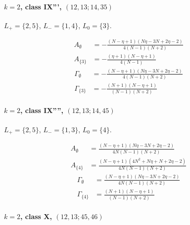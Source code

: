 \documentclass[11pt]{article}
\begin{document}
\paragraph{$k=2$, class IX''', $(12,13;14,35)$}

$L_+=\{2,5\}$, $L_-=\{1,4\}$, $L_0=\{3\}$.

\begin{align*}
  A_{\emptyset} &= - \frac{\left(N - \eta + 1\right) \left(N \eta - 3 N + 2 \eta - 2\right)}{4 \left(N - 1\right) \left(N + 2\right)} \\
  A_{\{3\}} &= - \frac{\left(\eta + 1\right) \left(N - \eta + 1\right)}{4 \left(N - 1\right)} 
\end{align*}
\begin{align*}
  \Gamma_{\emptyset} &= - \frac{\left(N - \eta + 1\right) \left(N \eta - 3 N + 2 \eta - 2\right)}{4 \left(N - 1\right) \left(N + 2\right)} \\
  \Gamma_{\{3\}} &= - \frac{\left(N + 1\right) \left(N - \eta + 1\right)}{\left(N - 1\right) \left(N + 2\right)} 
\end{align*}

\paragraph{$k=2$, class IX'''', $(12,13;14,45)$}

$L_+=\{2,5\}$, $L_-=\{1,3\}$, $L_0=\{4\}$.

\begin{align*}
  A_{\emptyset} &= \frac{\left(N - \eta + 1\right) \left(N \eta - 3 N + 2 \eta - 2\right)}{4 N \left(N - 1\right) \left(N + 2\right)} \\
  A_{\{4\}} &= \frac{\left(N - \eta + 1\right) \left(4 N^{2} + N \eta + N + 2 \eta - 2\right)}{4 N \left(N - 1\right) \left(N + 2\right)} 
\end{align*}
\begin{align*}
  \Gamma_{\emptyset} &= \frac{\left(N - \eta + 1\right) \left(N \eta - 3 N + 2 \eta - 2\right)}{4 N \left(N - 1\right) \left(N + 2\right)} \\
  \Gamma_{\{4\}} &= \frac{\left(N + 1\right) \left(N - \eta + 1\right)}{\left(N - 1\right) \left(N + 2\right)} 
\end{align*}

\paragraph{$k=2$, class X, $(12,13;45,46)$}
\end{document}
